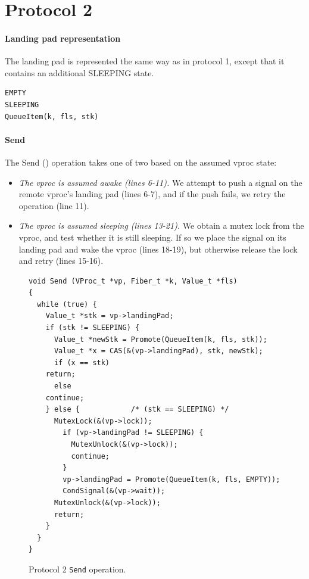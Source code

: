 \documentclass[11pt]{article}
\begin{document}
\section{Protocol 2}\label{sec:protocol2}

\paragraph{Landing pad representation}
The landing pad is represented the same way as in protocol 1, except that it 
contains an additional SLEEPING state.
\lstset{language=C}
\lstset{commentstyle=\textit}
\begin{lstlisting}
EMPTY
SLEEPING
QueueItem(k, fls, stk)
\end{lstlisting}

\paragraph{Send}
The Send () operation takes one of two based on the assumed
vproc state:
\begin{itemize}
\item \emph{The vproc is assumed awake (lines 6-11).} We attempt to push a signal on the remote vproc's landing pad (lines 6-7), and
if the push fails, we retry the operation (line 11).
\item \emph{The vproc is assumed sleeping (lines 13-21).} We obtain a mutex lock from the vproc, and test
whether it is still sleeping.
If so we place the signal on its landing pad and wake the vproc (lines 18-19), 
but otherwise release the lock and retry (lines 15-16).
\end{itemize}

\begin{figure}
\lstset{language=C}
\lstset{commentstyle=\textit}
\lstset{numbers=left}
\begin{lstlisting}
void Send (VProc_t *vp, Fiber_t *k, Value_t *fls)
{
  while (true) {
    Value_t *stk = vp->landingPad;
    if (stk != SLEEPING) {
      Value_t *newStk = Promote(QueueItem(k, fls, stk));
      Value_t *x = CAS(&(vp->landingPad), stk, newStk);
      if (x == stk)
	return;
      else
	continue;
    } else {            /* (stk == SLEEPING) */
      MutexLock(&(vp->lock));
        if (vp->landingPad != SLEEPING) {
          MutexUnlock(&(vp->lock));
          continue;
        }
        vp->landingPad = Promote(QueueItem(k, fls, EMPTY));
        CondSignal(&(vp->wait));
      MutexUnlock(&(vp->lock));
      return;
    }
  }
}
\end{lstlisting}
\caption{Protocol 2 \texttt{Send} operation.}\label{fig:protocol2-send}
\end{figure}
\end{document}
